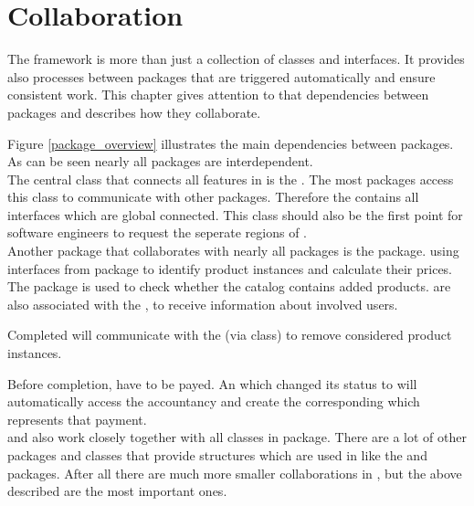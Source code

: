 \chapter{Collaboration}

The \salespoint{} framework is more than just a collection of classes and interfaces. It provides also processes between packages that are triggered automatically and ensure consistent work. This chapter gives attention to that dependencies between packages and describes how they collaborate.  

Figure \ref{package_overview} illustrates the main dependencies between \salespoint{} packages. As can be seen nearly all packages are interdependent.\\ 

The central class that connects all features in \salespoint{} is the . The most packages access this class to communicate with other packages. Therefore the  contains all interfaces which are global connected. This class should also be the first point for software engineers to request the seperate regions of \salespoint{}.\\

Another package that collaborates with nearly all packages is the  package.  using interfaces from  package to identify product instances and calculate their prices. The  package is used to check whether the catalog contains added products.  are also associated with the , to receive information about involved users.\par 
Completed  will communicate with the  (via  class) to remove considered product instances. \par
Before completion,  have to be payed. An  which changed its status to  will automatically access the accountancy and create the corresponding  which represents that payment.\\ 

 and  also work closely together with all classes in  package. There are a lot of other packages and classes that provide structures which are used in \salespoint{} like the  and  packages. After all there are much more smaller collaborations in \salespoint{}, but the above described are the most important ones.




